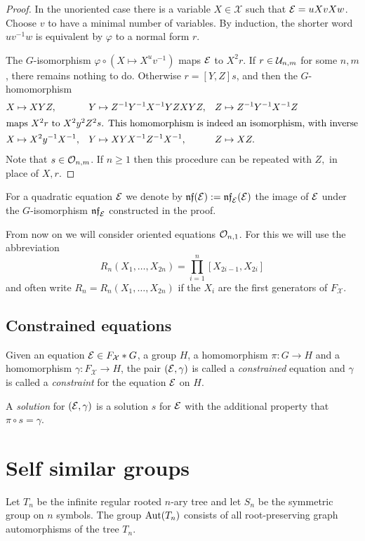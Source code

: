 \documentclass[a4paper,11pt]{amsart}
\begin{document}
\begin{proof}
  In the unoriented case there is a variable $X\in\mathcal{X}$ such that
  $\mathcal{E} = uXvXw$. Choose $v$ to have a minimal number of variables.
  By induction, the shorter word
  $uv^{-1}w$ is equivalent by $\varphi$ to a normal form $r$.
 
  The $G$-isomorphism $\varphi \circ (X\mapsto X^uv^{-1})$ maps $\mathcal{E}$ to
  $X^2r$. If $r\in \mathcal{U}_{n,m}$ for some $n,m$,
  there remains nothing to do.  Otherwise $r=[Y,Z]s$, and then the
  $G$-homomorphism
  \begin{align*}
    X&\mapsto XYZ, & Y&\mapsto Z^{-1}Y^{-1}X^{-1}YZXYZ, & Z&\mapsto Z^{-1}Y^{-1}X^{-1}Z \\
  \intertext{maps $X^2r$ to $X^2y^2Z^2s$. This homomorphism is indeed an
  isomorphism, with inverse}
    X&\mapsto X^2y^{-1}X^{-1}, & Y&\mapsto XYX^{-1}Z^{-1}X^{-1}, & Z&\mapsto XZ.
  \end{align*}
  Note that $s \in \mathcal{O}_{n,m}$. If $n\geq 1$ then this procedure can be repeated with
  $Z,$ in place of $X,r$.
\end{proof}
For a quadratic equation $\mathcal{E}$ we denote by $\mathfrak{nf}(\mathcal{E}) := \mathfrak{nf}_{\mathcal{E}}(\mathcal{E})$
the image of $\mathcal{E}$ under the $G$-isomorphism $\mathfrak{nf}_{\mathcal{E}}$ constructed in
the proof.

From now on we will consider oriented equations $\mathcal{O}_{n,1}$. For this
we will use the abbreviation
\[R_n(X_1,\dotsc,X_{2n})=\prod_{i=1}^n [X_{2i-1},X_{2i}]\]
and often write $R_n=R_n(X_1,\dotsc,X_{2n})$ if the $X_i$ are the
first generators of $F_{\mathcal{X}}$.

\subsection{Constrained equations}
\begin{defi}
  Given an equation $\mathcal{E} \in F_{\mathcal{X}}*G$, a group $H$, a homomorphism
  $\pi\colon G \to H$ and a homomorphism $\gamma\colon F_{\mathcal{X}} \to H$, the
  pair $(\mathcal{E},\gamma)$ is called a \emph{constrained} equation and
  $\gamma$ is called a \emph{constraint} for the equation $\mathcal{E}$ on $H$.
 
  A \emph{solution} for $(\mathcal{E},\gamma)$ is a solution $s$ for $\mathcal{E}$ with the
  additional property that $\pi\circ s=\gamma$.
\end{defi}

\section{Self similar groups}\label{sec:SelfSimilarGroups}
Let $T_n$ be the infinite regular rooted $n$-ary tree and let $S_n$ be the symmetric group on $n$ symbols.
The group $\operatorname{{Aut}}(T_n)$ consists of all root-preserving graph automorphisms of the tree $T_n$. 
\end{document}
